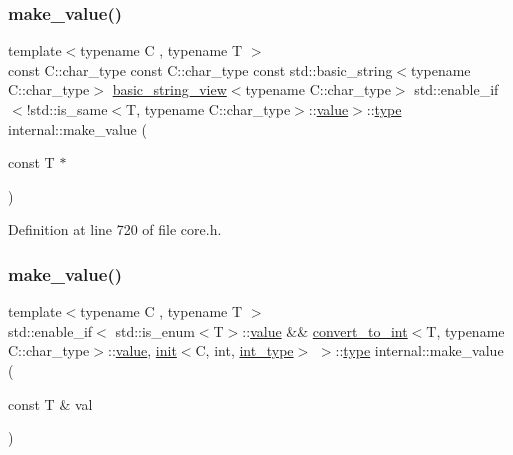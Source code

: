 \subsubsection{\texorpdfstring{make\+\_\+value()}{make\_value()}\hspace{0.1cm}{\footnotesize\ttfamily [3/8]}}
{\footnotesize\ttfamily template$<$typename C , typename T $>$ \\
const C\+::char\+\_\+type const C\+::char\+\_\+type const std\+::basic\+\_\+string$<$typename C\+::char\+\_\+type$>$ \hyperlink{classbasic__string__view}{basic\+\_\+string\+\_\+view}$<$typename C\+::char\+\_\+type$>$ std\+::enable\+\_\+if$<$!std\+::is\+\_\+same$<$T, typename C\+::char\+\_\+type$>$\+::\hyperlink{classinternal_1_1value}{value}$>$\+::\hyperlink{namespaceinternal_a8661864098ac0acff9a6dd7e66f59038}{type} internal\+::make\+\_\+value (\begin{DoxyParamCaption}\item[{const T $\ast$}]{ }\end{DoxyParamCaption})}



Definition at line 720 of file core.\+h.

\mbox{\label{namespaceinternal_a3d03eb7eebca822d2083354e5a7ec60a}} 
\subsubsection{\texorpdfstring{make\+\_\+value()}{make\_value()}\hspace{0.1cm}{\footnotesize\ttfamily [4/8]}}
{\footnotesize\ttfamily template$<$typename C , typename T $>$ \\
std\+::enable\+\_\+if$<$ std\+::is\+\_\+enum$<$T$>$\+::\hyperlink{classinternal_1_1value}{value} \&\& \hyperlink{structconvert__to__int}{convert\+\_\+to\+\_\+int}$<$T, typename C\+::char\+\_\+type$>$\+::\hyperlink{classinternal_1_1value}{value}, \hyperlink{structinternal_1_1init}{init}$<$C, int, \hyperlink{namespaceinternal_a8661864098ac0acff9a6dd7e66f59038a8be38ea7253d1a414964476f31d00064}{int\+\_\+type}$>$ $>$\+::\hyperlink{namespaceinternal_a8661864098ac0acff9a6dd7e66f59038}{type} internal\+::make\+\_\+value (\begin{DoxyParamCaption}\item[{const T \&}]{val }\end{DoxyParamCaption})\hspace{0.3cm}{\ttfamily [inline]}}



